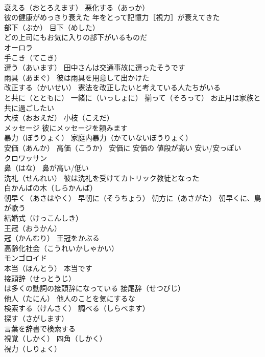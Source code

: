 \documentclass[8pt]{extreport}
\begin{document}
\begin{CJK}{UTF8}{min}
\\	衰える（おとろえます） 悪化する（あっか）
\\	彼の健康がめっきり衰えた 年をとって記憶力［視力］が衰えてきた
\\	部下（ぶか） 目下（めした）
\\	どの上司にもお気に入りの部下がいるものだ
\\	オーロラ
\\	手こき（てこき）
\\	遭う（あいます） 田中さんは交通事故に遭ったそうです
\\	雨具（あまぐ） 彼は雨具を用意して出かけた
\\	改正する（かいせい） 憲法を改正したいと考えている人たちがいる
\\	と共に（とともに） 一緒に（いっしょに） 揃って（そろって） お正月は家族と共に過ごしたい
\\	大枝（おおえだ） 小枝（こえだ）
\\	メッセージ 彼にメッセージを頼みます
\\	暴力（ぼうりょく） 家庭内暴力（かていないぼうりょく）
\\	安価（あんか） 高価（こうか） 安価に 安価の 値段が高い 安い/安っぽい
\\	クロワッサン
\\	鼻（はな） 鼻が高い/低い
\\	洗礼（せんれい） 彼は洗礼を受けてカトリック教徒となった
\\	白かんばの木（しらかんば）
\\	朝早く（あさはやく） 早朝に（そうちょう） 朝方に（あさがた） 朝早くに、鳥が歌う
\\	結婚式（けっこんしき）
\\	王冠（おうかん）
\\	冠（かんむり） 王冠をかぶる
\\	高齢化社会（こうれいかしゃかい）
\\	モンゴロイド
\\	本当（ほんとう） 本当です
\\	接頭辞（せっとうじ） 
\\	は多くの動詞の接頭辞になっている 接尾辞（せつびじ）
\\	他人（たにん） 他人のことを気にするな
\\	検索する（けんさく） 調べる（しらべます）
\\	探す（さがします）
\\	言葉を辞書で検索する
\\	視覚（しかく） 四角（しかく）
\\	視力（しりょく） 

\end{CJK}
\end{document}
